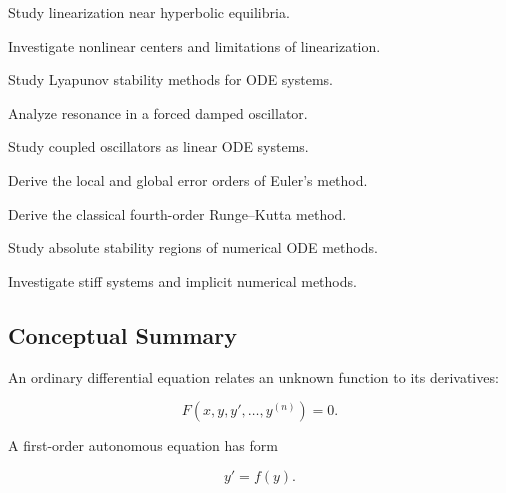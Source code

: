 \begin{exercise}[4]
Study linearization near hyperbolic equilibria.
\end{exercise}

\begin{exercise}[4]
Investigate nonlinear centers and limitations of linearization.
\end{exercise}

\begin{exercise}[4]
Study Lyapunov stability methods for ODE systems.
\end{exercise}

\begin{exercise}[4]
Analyze resonance in a forced damped oscillator.
\end{exercise}

\begin{exercise}[4]
Study coupled oscillators as linear ODE systems.
\end{exercise}

\begin{exercise}[4]
Derive the local and global error orders of Euler's method.
\end{exercise}

\begin{exercise}[4]
Derive the classical fourth-order Runge--Kutta method.
\end{exercise}

\begin{exercise}[4]
Study absolute stability regions of numerical ODE methods.
\end{exercise}

\begin{exercise}[4]
Investigate stiff systems and implicit numerical methods.
\end{exercise}

\subsection{Conceptual Summary}
\label{subsec:ode-summary}

An ordinary differential equation relates an unknown function to its
derivatives:

\[
\boxed{
F
(
x,
y,
y',
\ldots,
y^{(n)}
)
=
0.
}
\]

A first-order autonomous equation has form

\[
\boxed{
y'=f(y).
}
\]

